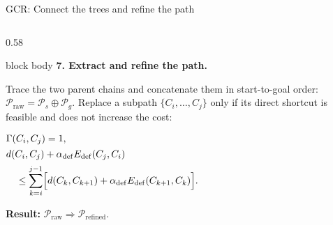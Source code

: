 \documentclass[aspectratio=169,10pt]{beamer}
\begin{document}
\begin{frame}[t]{GCR: Connect the trees and refine the path}
\begin{columns}[T,onlytextwidth]
\begin{column}{0.58\textwidth}
      \vspace{0.035cm}
      \begin{beamercolorbox}[wd=\textwidth,sep=0.07cm]{block body}
        \fontsize{6.4}{6.9}\selectfont
        \textbf{7. Extract and refine the path.}\par\vspace{0.2ex}
        Trace the two parent chains and concatenate them in start-to-goal order:
        \(
          \mathcal P_{\mathrm{raw}}=\mathcal P_s\oplus\mathcal P_g.
        \)
        Replace a subpath \(\{C_i,\ldots,C_j\}\) only if its direct shortcut is
        feasible and does not increase the cost:
        \par\centering\vspace{0.2ex}
        {\fontsize{5.8}{6.4}\selectfont
        \(
          \begin{aligned}
            &\Gamma(C_i,C_j)=1,\\[0.2ex]
            &d(C_i,C_j)+\alpha_{\mathrm{def}}E_{\mathrm{def}}(C_j,C_i)\\[0.2ex]
            &\quad\leq\sum_{k=i}^{j-1}\Bigl[
              d(C_k,C_{k+1})
              +\alpha_{\mathrm{def}}E_{\mathrm{def}}(C_{k+1},C_k)
              \Bigr].
          \end{aligned}
        \)}
        \par\raggedright\vspace{0.2ex}
        {\textbf{Result:}\enspace
        \(\mathcal P_{\mathrm{raw}}
        \Rightarrow\mathcal P_{\mathrm{refined}}\).}
      \end{beamercolorbox}
    \end{column}
  \end{columns}
\end{frame}
\end{document}

